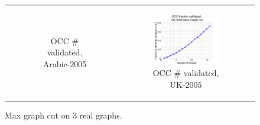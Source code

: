\begin{figure}[ht]
\begin{tabular}{ccc}
\begin{subfigure}[b]{0.31\textwidth}
			\caption{OCC \# validated, Arabic-2005}
			\label{appfig:validated_OCC_arabic2005_maxgraphcut}
	  \end{subfigure} &
	  \begin{subfigure}[b]{0.31\textwidth}
	  	\includegraphics[width=150pt]{images/validated_OCC_uk2005_maxgraphcut.png}
			\caption{OCC \# validated, UK-2005}
			\label{appfig:validated_OCC_uk2005_maxgraphcut}
	  \end{subfigure} \\
  \end{tabular}
  \caption{Max graph cut on 3 real graphs.}
\end{figure}

